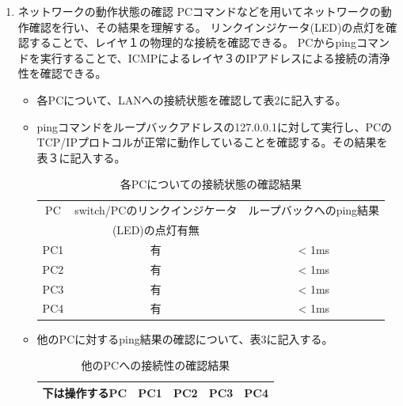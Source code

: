 \documentclass[10pt]{article}
\begin{document}
\begin{enumerate}
    \item ネットワークの動作状態の確認
    PCコマンドなどを用いてネットワークの動作確認を行い、その結果を理解する。 リンクインジケータ(LED)の点灯を確認することで、レイヤ１の物理的な接続を確認できる。 PCからpingコマンドを実行することで、ICMPによるレイヤ３のIPアドレスによる接続の清浄性を確認できる。 
    \begin{itemize}
        \item 各PCについて、LANへの接続状態を確認して表2に記入する。
        \item pingコマンドをループバックアドレスの127.0.0.1に対して実行し、PCのTCP/IPプロトコルが正常に動作していることを確認する。その結果を表３に記入する。
        
        \begingroup
            \setlength{\tabcolsep}{5pt} %
            \renewcommand{\arraystretch}{1.5} %
            \begin{table}[H]
            \centering
        	\caption{各PCについての接続状態の確認結果}
        	\begin{tabular}{|c|c|c|}
        	    \hline
        	    PC &  switch/PCのリンクインジケータ  & ループバックへのping結果\\
        	    & (LED)の点灯有無 & \\ [0.5ex] 
        		\hline\hline
                	PC1 & 有 & < 1ms\\ \hline
                    PC2 & 有 & < 1ms\\ \hline
                    PC3 & 有 & < 1ms\\ \hline
                    PC4 & 有 & < 1ms\\ \hline
        	\end{tabular}
        \end{table} 
        \endgroup
        
        \item 他のPCに対するping結果の確認について、表3に記入する。
        \begingroup
            \setlength{\tabcolsep}{5pt} %
            \renewcommand{\arraystretch}{1.5} %
            \begin{table}[H]
            \centering
        	\caption{他のPCへの接続性の確認結果}
        	\begin{tabular}{|c|c|c|c|c|c|}
        	    \hline
        	    \multicolumn{2}{|c}{下は操作するPC} & \multicolumn{1}{|c|}{PC1} & \multicolumn{1}{|c|}{PC2} & \multicolumn{1}{|c|}{PC3} & \multicolumn{1}{|c|}{PC4}\\ \hline
        	     

\end{tabular}
\end{table}
\end{itemize}
\end{enumerate}
\end{document}
